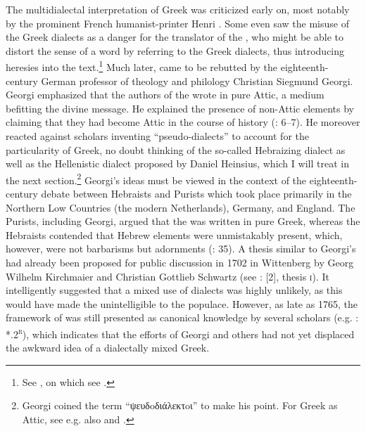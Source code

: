 The multidialectal interpretation of  Greek was criticized early on, most notably by the prominent French humanist-printer Henri \citet[32–33, 138]{Estienne1581}. Some even saw the misuse of the Greek dialects as a danger for the  translator of the , who might be able to distort the sense of a word by referring to the Greek dialects, thus introducing heresies into the text.\footnote{See \citet[429]{Rainolds1583}, on which see \citet[654--655]{VanRooyConsidine2016}.} Much later,  came to be rebutted by the eighteenth-century German professor of theology and philology Christian Siegmund Georgi. Georgi emphasized that the authors of the  wrote in pure Attic, a medium befitting the divine message. He explained the presence of non-Attic elements by claiming that they had become Attic in the course of history (\citealt{Georgi1733}: 6–7). He moreover reacted against scholars inventing “pseudo-dialects” to account for the particularity of  Greek, no doubt thinking of the so-called Hebraizing dialect as well as the Hellenistic dialect proposed by Daniel Heinsius, which I will treat in the next section.\footnote{Georgi coined the term “ψευδoδιάλεκτoι” to make his point. For  Greek as Attic, see e.g. also \citet[3, 10--12]{Georgi1729} and \citet[b.7\textsc{\textsuperscript{r}}–b.8\textsc{\textsuperscript{v}}]{Fischer1754}.} Georgi’s ideas must be viewed in the context of the eighteenth-century debate between Hebraists and Purists which took place primarily in the Northern Low Countries (the modern Netherlands), Germany, and England. The Purists, including Georgi, argued that the  was written in pure Greek, whereas the Hebraists contended that Hebrew elements were unmistakably present, which, however, were not barbarisms but adornments (\citealt{De1980}: 35). A thesis similar to Georgi’s had already been proposed for public discussion in 1702 in Wittenberg by Georg Wilhelm Kirchmaier and Christian Gottlieb Schwartz (see \citealt{Kirchmaier1702}: [2], thesis \textsc{i}). It intelligently suggested that a mixed use of dialects was highly unlikely, as this would have made the  unintelligible to the populace. However, as late as 1765, the framework of  was still presented as canonical knowledge by several scholars (e.g. \citealt{Gottleber1765}: *.2\textsc{\textsuperscript{r}}), which indicates that the efforts of Georgi and others had not yet displaced the awkward idea of a dialectally mixed  Greek.

